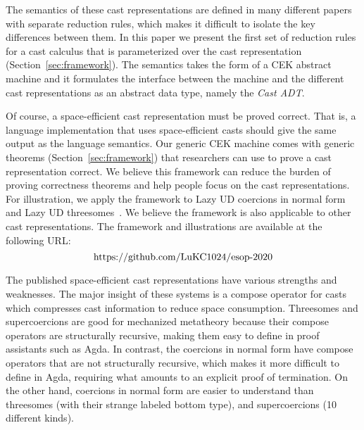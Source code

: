 \documentclass[runningheads]{llncs}
\newcommand{\urlFrameworkAndIllustration}{
	\url{https://github.com/LuKC1024/esop-2020}
}
\begin{document}
The semantics of these cast representations are defined in many
different papers with separate reduction rules, which makes it
difficult to isolate the key differences between them.  In this paper
we present the first set of reduction rules for a cast calculus that
is parameterized over the cast representation
(Section~\ref{sec:framework}). The semantics takes the form of a CEK
abstract machine and it formulates the interface between the machine
and the different cast representations as an abstract data type,
namely the \emph{Cast ADT}.

Of course, a space-efficient cast representation must be proved
correct. That is, a language implementation that uses space-efficient
casts should give the same output as the language semantics. Our
generic CEK machine comes with generic theorems
(Section~\ref{sec:framework}) that researchers can use to prove a cast
representation correct.  We believe this framework can reduce the
burden of proving correctness theorems and help people focus on the
cast representations.
For illustration, we apply the framework to
Lazy UD coercions in normal form~\citep{Siek:2015:BCT:2737924.2737968}
and Lazy UD threesomes~\citep{Siek:2010:TWB:1706299.1706342}. We
believe the framework is also applicable to other cast
representations.  The framework and illustrations are available at the
following URL:
\[\text{\urlFrameworkAndIllustration}\]


The published space-efficient cast representations have various
strengths and weaknesses.  The major insight of these systems is a
compose operator for casts which compresses cast information to reduce
space consumption.  Threesomes and supercoercions are good for
mechanized metatheory because their compose operators are structurally
recursive, making them easy to define in proof assistants such as
Agda. In contrast, the coercions in normal form have compose operators
that are not structurally recursive, which makes it more difficult to
define in Agda, requiring what amounts to an explicit proof of
termination.
%
On the other hand, coercions in normal form are easier to understand
than threesomes (with their strange labeled bottom type), and
supercoercions (10 different kinds).
\end{document}
